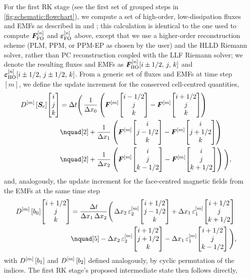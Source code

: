 For the first RK stage (see the first set of grouped steps in \cref{fig:schematic:flowchart}), we compute a set of high-order, low-dissipation fluxes and EMFs as described in  and ; this calculation is identical to the one used to compute $\bm{F}_\mathrm{FO}^{[n]}$ and $\bm{\varepsilon}_\mathrm{FO}^{[n]}$ above, except that we use a higher-order reconstruction scheme (PLM, PPM, or PPM-EP as chosen by the user) and the HLLD Riemann solver, rather than PC reconstruction coupled with the LLF Riemann solver; we denote the resulting fluxes and EMFs as $\bm{F}_\mathrm{HO}^{[n]}\!\left[ i \pm 1/2,\,j,\,k \right]$ and $\bm{\varepsilon}_\mathrm{HO}^{[n]}\!\left[ i \pm 1/2,\,j \pm 1/2,\,k \right]$. From a generic set of fluxes and EMFs at time step $[m]$, we define the update increment for the conserved cell-centred quantities,
\begin{align}
    D^{[m]}\sbrac{\mVector{S}_\mathrm{c}}\EvalAtV{i}{j}{k}
        &= \Delta t \Bigg(
            \, \frac{1}{\Delta{x_0}} \rbrac{
                \mVector{F}^{[m]}\EvalAtV{i - 1/2}{j}{k}
                - \mVector{F}^{[m]}\EvalAtV{i + 1/2}{j}{k}
            }
        \nonumber \\
        &\nquad[2]
            + \frac{1}{\Delta{x_1}} \rbrac{
                \mVector{F}^{[m]}\EvalAtV{i}{j - 1/2}{k}
                - \mVector{F}^{[m]}\EvalAtV{i}{j + 1/2}{k}
            }
        \nonumber \\
        &\nquad[2]
            + \frac{1}{\Delta{x_2}} \rbrac{
                \mVector{F}^{[m]}\EvalAtV{i}{j}{k - 1/2}
                - \mVector{F}^{[m]}\EvalAtV{i}{j}{k + 1/2}
            }
        \Bigg)
    , \label{eqn:rk:increment-state}
\end{align}
and, analogously, the update increment for the face-centred magnetic fields from the EMFs at the same time step
\begin{align}
    D^{[m]}\sbrac{b_0}\EvalAtV{i + 1/2}{j}{k}
        &= \frac{\Delta t}{\Delta{x_1} \, \Delta{x_2}} \Bigg(
            \, \Delta{x_2} \, \varepsilon_2^{[m]}\EvalAtV{i + 1/2}{j - 1/2}{k}
            + \Delta{x_1} \, \varepsilon_1^{[m]}\EvalAtV{i + 1/2}{j}{k + 1/2}
        \nonumber \\
        &\nquad[5]
            - \Delta{x_2} \, \varepsilon_2^{[m]}\EvalAtV{i + 1/2}{j + 1/2}{k}
            - \Delta{x_1} \, \varepsilon_1^{[m]}\EvalAtV{i + 1/2}{j}{k - 1/2}
    \Bigg)
    , \label{eqn:rk:increment-bfield}
\end{align}
with $D^{[m]}\left[ b_1 \right]$ and $D^{[m]}\left[ b_2 \right]$ defined analogously, by cyclic permutation of the indices. The first RK stage's proposed intermediate state then follows directly,
